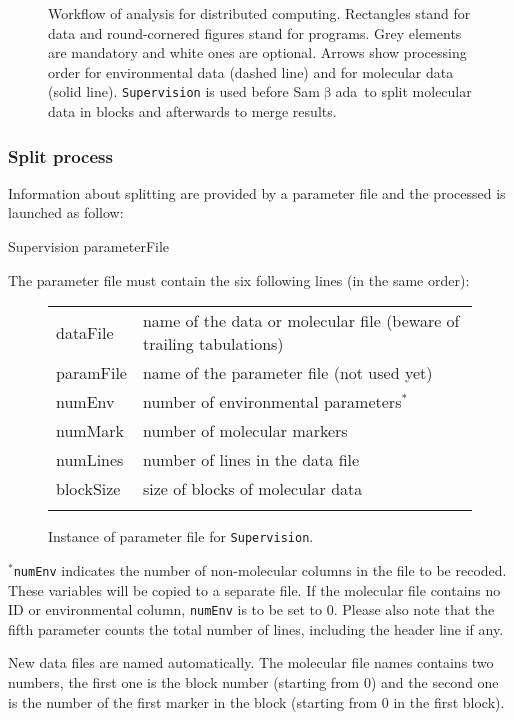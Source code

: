 \documentclass[a4paper,11pt]{article}
\newcommand{\smb}{\textsf{Sam$\upbeta$ada}}
\newcommand{\prog}[1]{\texttt{#1}}
\newenvironment{launch}{\begin{mdframed}\ttfamily}{\end{mdframed}}
\begin{document}
\begin{figure}[htbp]
\begin{center}
\caption{Workflow of analysis for distributed computing.
Rectangles stand for data and round-cornered figures stand for programs.
Grey elements are mandatory and white ones are optional.
Arrows show processing order for environmental data (dashed line) and for molecular data (solid line).
\prog{Supervision} is used before \smb\  to split molecular data in blocks and afterwards to merge results.}
\label{fig:workflow-supervision}
\end{center}
\end{figure}

\subsubsection{Split process}
Information about splitting are provided by a parameter file and the processed is launched as follow: 
\begin{launch}
Supervision parameterFile
\end{launch}
The parameter file must contain the six following lines (in the same order):
\begin{figure}[H]
\centering
\begin{tabular}{|>{\ttfamily}l|l}
\cline{1-1}
dataFile &		name of the data or molecular file \scriptsize(beware of trailing tabulations)\\	
paramFile & 	name of the parameter file (not used yet)\\	
numEnv	&	number of environmental parameters$^{\ast}$\\	
numMark	&  	number of molecular markers\\
numLines	&	number of lines in the data file\\
blockSize	&	size of blocks of molecular data\\
\cline{1-1}
 \end{tabular}%
 \caption{Instance of parameter file for \prog{Supervision}.}
 \label{fig:paramSupervision}
\end{figure}
\noindent
$^{\ast}$\texttt{numEnv} indicates the number of non-molecular columns in the file to be recoded.
These variables will be copied to a separate file.
If the molecular file contains no ID or environmental column, \texttt{numEnv} is to be set to 0.
Please also note that the fifth parameter counts the total number of lines, including the header line if any.

New data files are named automatically.
The molecular file names contains two numbers, the first one is the block number (starting from 0) and the second one is the number of the first marker in the block (starting from 0 in the first block).
\end{document}
